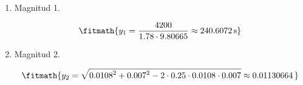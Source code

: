 \begin{enumerate}

\item Magnitud 1.

\[\fitmath{y_{1}=\frac{4200}{1.78\cdot 9.80665}\approx 240.6072\,\mathrm{s}}\]

\item Magnitud 2.

\[\fitmath{y_{2}=\sqrt{{0.0108}^{2}+{0.007}^{2}-2\cdot 0.25\cdot 0.0108\cdot 0.007}\approx 0.01130664\,}\]

\end{enumerate}
